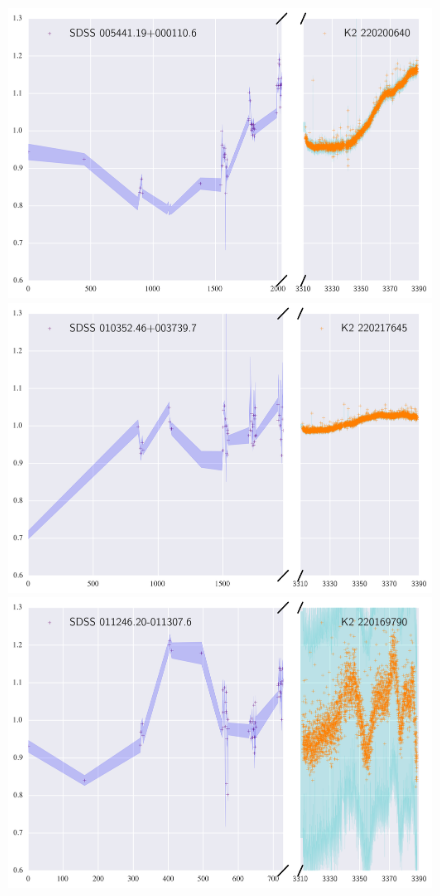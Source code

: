\documentclass[a4paper,fleqn,usenatbib]{mnras}
\begin{document}
        \begin{figure}
        	\includegraphics[width=\columnwidth]{220200640ExtendedLC.png}
        	\includegraphics[width=\columnwidth]{220217645ExtendedLC.png}
        	\includegraphics[width=\columnwidth]{220169790ExtendedLC.png}
        	\caption{}
        	\label{fig:example_figure}
        \end{figure}      
        
\end{document}
